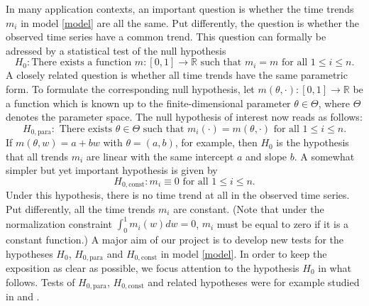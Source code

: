 \documentclass[a4paper,12pt]{article}
\begin{document}
\noindent In many application contexts, an important question is whether the time trends $m_i$ in model \eqref{model} are all the same. Put differently, the question is whether the observed time series
have a common trend. This question can formally be adressed by a statistical test of the null hypothesis 
\[ H_0: \text{There exists a function } m: [0,1] \rightarrow \mathbb{R} \text{ such that } m_i = m  \text{ for all } 1 \le i \le n. \]
A closely related question is whether all time trends have the same parametric form. To formulate the corresponding null hypothesis, let $m(\theta,\cdot): [0,1] \rightarrow \mathbb{R}$ be a function which is known up to the finite-dimensional parameter $\theta \in \Theta$, where $\Theta$ denotes the parameter space. The null hypothesis of interest now reads as follows:  
\[ H_{0,\text{para}}: \text{ There exists } \theta \in \Theta \text{ such that } m_i(\cdot) = m(\theta,\cdot) \text{ for all } 1 \le i \le n. \]  
If $m(\theta,w) = a + b w$ with $\theta = (a,b)$, for example, then $H_0$ is the hypothesis that all trends $m_i$ are linear with the same intercept $a$ and slope $b$. A somewhat simpler but yet important hypothesis is given by 
\[ H_{0,\text{const}}: m_i \equiv 0 \text{ for all } 1 \le i \le n. \]
Under this hypothesis, there is no time trend at all in the observed time series. Put differently, all the time trends $m_i$ are constant. (Note that under the normalization constraint $\int_0^1 m_i(w) dw = 0$, $m_i$ must be equal to zero if it is a constant function.) A major aim of our project is to develop new tests for the hypotheses $H_0$, $H_{0,\text{para}}$ and $H_{0,\text{const}}$ in model \eqref{model}. In order to keep the exposition as clear as possible, we focus attention to the hypothesis $H_0$ in what follows. Tests of $H_{0,\text{para}}$, $H_{0,\text{const}}$ and related hypotheses were for example studied in \cite{Lyubchich2016} and \cite{ChenWu2018}. 
\end{document}
